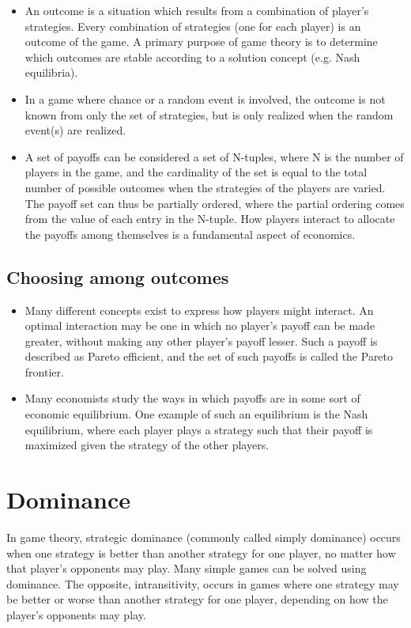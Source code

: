 \documentclass[]{report}
\begin{document}

\begin{itemize}
\item An outcome is a situation which results from a combination of player's strategies. Every combination of strategies (one for each player) is an outcome of the game. A primary purpose of game theory is to determine which outcomes are stable according to a solution concept (e.g. Nash equilibria).
\item 
In a game where chance or a random event is involved, the outcome is not known from only the set of strategies, but is only realized when the random event(s) are realized.
\item 
A set of payoffs can be considered a set of N-tuples, where N is the number of players in the game, and the cardinality of the set is equal to the total number of possible outcomes when the strategies of the players are varied. The payoff set can thus be partially ordered, where the partial ordering comes from the value of each entry in the N-tuple. How players interact to allocate the payoffs among themselves is a fundamental aspect of economics.
\end{itemize}

\subsection{Choosing among outcomes}
\begin{itemize}
\item Many different concepts exist to express how players might interact. An optimal interaction may be one in which no player's payoff can be made greater, without making any other player's payoff lesser. Such a payoff is described as Pareto efficient, and the set of such payoffs is called the Pareto frontier.
\item 
Many economists study the ways in which payoffs are in some sort of economic equilibrium. One example of such an equilibrium is the Nash equilibrium, where each player plays a strategy such that their payoff is maximized given the strategy of the other players.
\end{itemize}

\section{Dominance}
In game theory, strategic dominance (commonly called simply dominance) occurs when one strategy is better than another strategy for one player, no matter how that player's opponents may play. Many simple games can be solved using dominance. The opposite, intransitivity, occurs in games where one strategy may be better or worse than another strategy for one player, depending on how the player's opponents may play.
\end{document}
